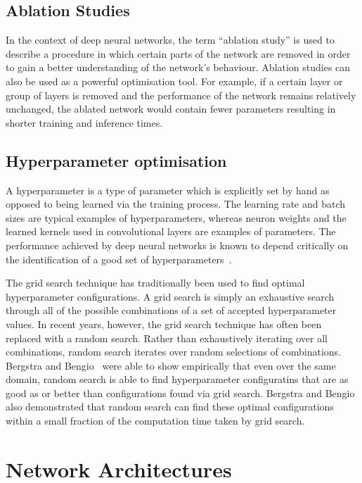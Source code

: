 \subsection{Ablation Studies}

In the context of deep neural networks, the term “ablation study” is used to describe a procedure in which certain parts of the network are removed in order to gain a better understanding of the network's behaviour. Ablation studies can also be used as a powerful optimisation tool. For example, if a certain layer or group of layers is removed and the performance of the network remains relatively unchanged, the ablated network would contain fewer parameters resulting in shorter training and inference times.

\subsection{Hyperparameter optimisation}
\label{sec:hyperparam}

A hyperparameter is a type of parameter which is explicitly set by hand as opposed to being learned via the training process. The learning rate and batch sizes are typical examples of hyperparameters, whereas neuron weights and the learned kernels used in convolutional layers are examples of parameters. The performance achieved by deep neural networks is known to depend critically on the identification of a good set of hyperparameters~\cite{hyperparam, goodhyperparam}.

The grid search technique has traditionally been used to find optimal hyperparameter configurations. A grid search is simply an exhaustive search through all of the possible combinations of a set of accepted hyperparameter values. In recent years, however, the grid search technique has often been replaced with a random search. Rather than exhaustively iterating over all combinations, random search iterates over random selections of combinations. Bergstra and Bengio~\cite{randomsearch} were able to show empirically that even over the same domain, random search is able to find hyperparameter configuratins that are as good as or better than configurations found via grid search. Bergstra and Bengio also demonstrated that random search can find these optimal configurations within a small fraction of the computation time taken by grid search.

\section{Network Architectures}

